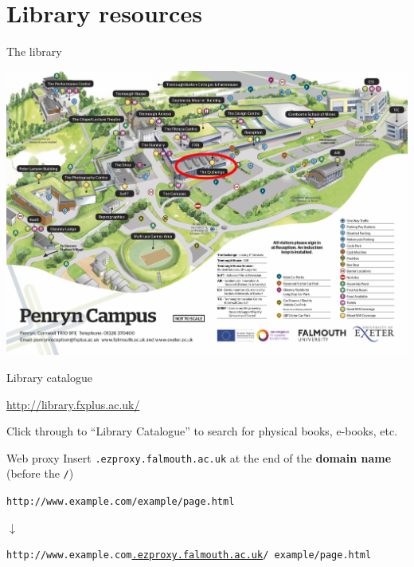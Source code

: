 \part{Library resources}
\frame{\partpage}

\begin{frame}{The library}
	\begin{center}
		\includegraphics[height=0.7\textheight]{campus_map}
	\end{center}
\end{frame}

\begin{frame}{Library catalogue}
	\begin{center}
		\url{http://library.fxplus.ac.uk/}
		
		\vspace{2ex}
		
		Click through to ``Library Catalogue'' to search for physical books, e-books, etc.
	\end{center}
\end{frame}

\begin{frame}{Web proxy}
	Insert \texttt{.ezproxy.falmouth.ac.uk} at the end of the \textbf{domain name}
		(before the \texttt{/})
	\pause
	\begin{center}
		\texttt{http://www.example.com/example/page.html}
		
		\pause $\downarrow$
		
		\texttt{http://www.example.com\uline{.ezproxy.falmouth.ac.uk}/ example/page.html}
	\end{center}
\end{frame}

